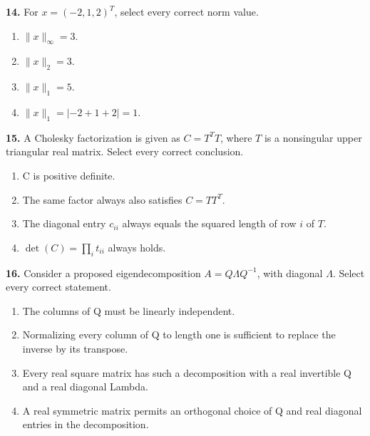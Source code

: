\documentclass[11pt,a4paper]{article}
\begin{document}
\par\noindent\begin{minipage}{\linewidth}
\textbf{14.} For \(x=(-2,1,2)^T\), select every correct norm value.
\begin{enumerate}[label=(\Alph*),leftmargin=8mm,itemsep=2pt,topsep=2pt]
\item \(\|x\|_\infty=3\).
\item \(\|x\|_2=3\).
\item \(\|x\|_1=5\).
\item \(\|x\|_1=|-2+1+2|=1\).
\end{enumerate}

\end{minipage}\par\vspace{3mm}
\par\noindent\begin{minipage}{\linewidth}
\textbf{15.} A Cholesky factorization is given as \(C=T^TT\), where \(T\) is a nonsingular upper triangular real matrix. Select every correct conclusion.
\begin{enumerate}[label=(\Alph*),leftmargin=8mm,itemsep=2pt,topsep=2pt]
\item C is positive definite.
\item The same factor always also satisfies \(C=TT^T\).
\item The diagonal entry \(c_{ii}\) always equals the squared length of row \(i\) of \(T\).
\item \(\det(C)=\prod_i t_{ii}\) always holds.
\end{enumerate}

\end{minipage}\par\vspace{3mm}
\par\noindent\begin{minipage}{\linewidth}
\textbf{16.} Consider a proposed eigendecomposition \(A=Q\Lambda Q^{-1}\), with diagonal \(\Lambda\). Select every correct statement.
\begin{enumerate}[label=(\Alph*),leftmargin=8mm,itemsep=2pt,topsep=2pt]
\item The columns of Q must be linearly independent.
\item Normalizing every column of Q to length one is sufficient to replace the inverse by its transpose.
\item Every real square matrix has such a decomposition with a real invertible Q and a real diagonal Lambda.
\item A real symmetric matrix permits an orthogonal choice of Q and real diagonal entries in the decomposition.
\end{enumerate}

\end{minipage}\par\vspace{3mm}
\end{document}
